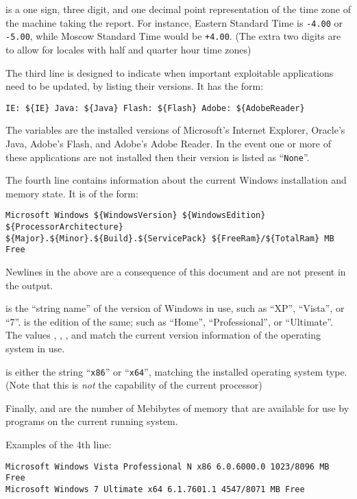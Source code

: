  is a one sign, three digit, and one decimal point representation
of the time zone of the machine taking the report. For instance, Eastern
Standard Time is \verb|-4.00| or \verb|-5.00|, while Moscow Standard Time would
be \verb|+4.00|. (The extra two digits are to allow for locales with half and
quarter hour time zones)

The third line is designed to indicate when important exploitable applications
need to be updated, by listing their versions. It has the form:
\begin{verbatim}
IE: ${IE} Java: ${Java} Flash: ${Flash} Adobe: ${AdobeReader}
\end{verbatim}

The variables are the installed versions of Microsoft's Internet Explorer,
Oracle's Java, Adobe's Flash, and Adobe's Adobe Reader. In the event one or more
of these applications are not installed then their version is listed as
``\verb|None|''.

The fourth line contains information about the current Windows installation and
memory state. It is of the form:
\begin{verbatim}
Microsoft Windows ${WindowsVersion} ${WindowsEdition} ${ProcessorArchitecture}
${Major}.${Minor}.${Build}.${ServicePack} ${FreeRam}/${TotalRam} MB Free
\end{verbatim}

Newlines in the above are a consequence of this document and are not present in
the output.

 is the ``string name'' of the version of Windows in use,
such as ``XP'', ``Vista'', or ``7''.  is the edition of the
same; such as ``Home'', ``Professional'', or ``Ultimate''. The values
, , , and  match the current
version information of the operating system in use.

 is either the string ``\verb|x86|'' or
``\verb|x64|'', matching the installed operating system type. (Note that this is
\textit{not} the capability of the current processor)

Finally,  and  are the number of Mebibytes of memory
that are available for use by programs on the current running system.

Examples of the 4th line:
\begin{verbatim}
Microsoft Windows Vista Professional N x86 6.0.6000.0 1023/8096 MB Free
Microsoft Windows 7 Ultimate x64 6.1.7601.1 4547/8071 MB Free
\end{verbatim}

